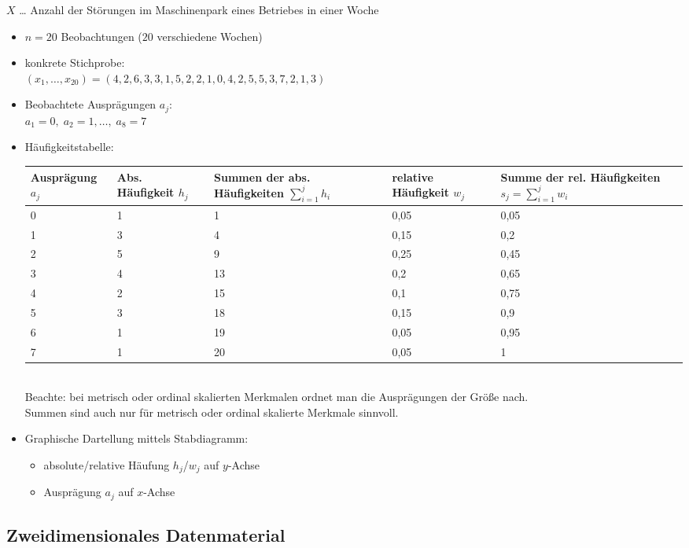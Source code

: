 \documentclass{scrreprt}
\begin{document}
 $X$ … Anzahl der Störungen im Maschinenpark eines Betriebes in einer Woche
\begin{itemize}
\item $n=20$ Beobachtungen ($20$ verschiedene Wochen)
\item konkrete Stichprobe:\\
$(x_1, \ldots , x_{20}) = (4,2,6,3,3,1,5,2,2,1,0,4,2,5,5,3,7,2,1,3)$
\item Beobachtete Ausprägungen $a_j$:\\
$a_1=0, \; a_2 = 1, \ldots, \; a_8=7$
\item Häufigkeitstabelle:\\
\begin{tabular}{L{0.15} | L{0.15} | L{0.2} | L{0.15} | L{0.2}}
Ausprägung $a_j$ & Abs. Häufigkeit $h_j$ & Summen der abs. Häufigkeiten $\sum_{i=1}^j h_i$ & relative Häufigkeit $w_j$ & Summe der rel. Häufigkeiten $s_j = \sum_{i=1}^j w_i$\\ & 1 & 1 & 0,05 & 0,05\\
1 & 3 & 4 & 0,15 & 0,2\\
2 & 5 & 9 & 0,25 & 0,45\\
3 & 4 & 13 & 0,2 & 0,65\\
4 & 2 & 15 & 0,1 & 0,75\\
5 & 3 & 18 & 0,15 & 0,9\\
6 & 1 & 19 & 0,05 & 0,95\\
7 & 1 & 20 & 0,05 & 1
\end{tabular}\\
Beachte: bei metrisch oder ordinal skalierten Merkmalen ordnet man die Ausprägungen der Größe nach.\\
Summen sind auch nur für metrisch oder ordinal skalierte Merkmale sinnvoll.
\item Graphische Dartellung mittels Stabdiagramm:
\begin{itemize}
\item absolute/relative Häufung $h_j$/$w_j$ auf $y$-Achse
\item Ausprägung $a_j$ auf $x$-Achse
\end{itemize}
\end{itemize}

\subsection{Zweidimensionales Datenmaterial}
\end{document}
